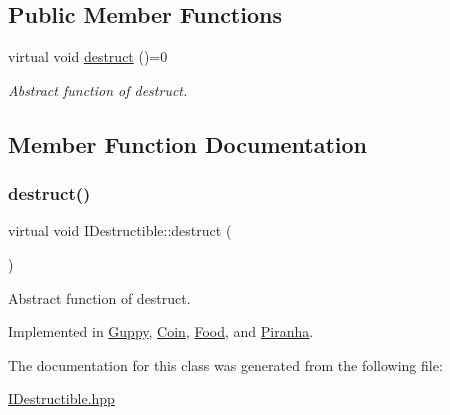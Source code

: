 \subsection*{Public Member Functions}
\begin{DoxyCompactItemize}
\item 
virtual void \mbox{\hyperlink{class_i_destructible_a63016d1bb4daa0a726fc8add9a0be62d}{destruct}} ()=0
\begin{DoxyCompactList}\small\item\em Abstract function of destruct. \end{DoxyCompactList}\end{DoxyCompactItemize}


\subsection{Member Function Documentation}
\mbox{\label{class_i_destructible_a63016d1bb4daa0a726fc8add9a0be62d}} 
\subsubsection{\texorpdfstring{destruct()}{destruct()}}
{\footnotesize\ttfamily virtual void I\+Destructible\+::destruct (\begin{DoxyParamCaption}{ }\end{DoxyParamCaption})\hspace{0.3cm}{\ttfamily [pure virtual]}}



Abstract function of destruct. 



Implemented in \mbox{\hyperlink{class_guppy_a26bc11223497fef2ae795283a5682407}{Guppy}}, \mbox{\hyperlink{class_coin_a16c42ef0d21f50bb08d4099d82b4ed57}{Coin}}, \mbox{\hyperlink{class_food_a5e1bfe34f8a4f4ce60accc57212c95c8}{Food}}, and \mbox{\hyperlink{class_piranha_a79c586a13bed4fb4aaa1b99c41c93c5a}{Piranha}}.



The documentation for this class was generated from the following file\+:\begin{DoxyCompactItemize}
\item 
\mbox{\hyperlink{_i_destructible_8hpp}{I\+Destructible.\+hpp}}\end{DoxyCompactItemize}
